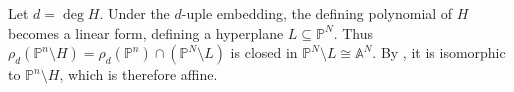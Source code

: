 Let $d=\deg H$. Under the $d$-uple embedding, the defining polynomial of $H$ becomes a linear form, defining a hyperplane $L\subseteq\mathbb P^N$. Thus $\rho_d(\mathbb P^n\setminus H)=\rho_d(\mathbb P^n)\cap(\mathbb P^N\setminus L)$ is closed in $\mathbb P^N\setminus L\cong\mathbb A^N$. By , it is isomorphic to $\mathbb P^n\setminus H$, which is therefore affine.
